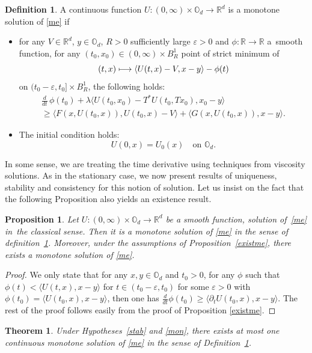 \documentclass[10pt]{amsart}
\newcommand\mto{\mathchoice{\longmapsto}{\mapsto}{\mapsto}{\mapsto}}
\let\epsilon\varepsilon
\newtheorem{Theorem}{Theorem}[section]
\newtheorem{Prop}{Proposition}[section]
\theoremstyle{definition}
\newtheorem{Def}{Definition}[section]
\begin{document}
\begin{Def}\label{defms}
A continuous function $U:(0,\infty)\!\times\!\mathbb{O}_d\!\to\! \mathbb{R}^d$ is a monotone solution of \eqref{me} if
\begin{itemize}
\item for any $V \in \mathbb{R}^d$, $y\!\in\!\mathbb{O}_d$, $R\!>\! 0$ sufficiently large $\epsilon\!>\!0$ and $\phi: \mathbb{R}\!\to\!\mathbb{R}$ a~smooth function, for any $(t_0,x_0)\in (0,\infty) \times B^1_R$ point of strict minimum of
\[
(t,x) \mto \langle U(t,x)-V, x-y\rangle-\phi(t)
\]
on $(t_0-\epsilon, t_0] \times B^1_R$, the following holds:
\begin{multline}\label{testt}
\frac{d}{dt}\, \phi(t_0) + \lambda \langle U(t_0,x_0)-T^*U(t_0,Tx_0),x_0-y \rangle \\
\geq
\langle F(x,U(t_0,x)), U(t_0,x)-V\rangle+\langle G(x,U(t_0,x)), x-y \rangle.
\end{multline}
\item The initial condition holds:
\begin{equation*}
U(0,x) = U_0(x) \quad\text{on } \mathbb{O}_d.
\end{equation*}
\end{itemize}
\end{Def}
In some sense, we are treating the time derivative using techniques from viscosity solutions. As in the stationary case, we now present results of uniqueness, stability and consistency for this notion of solution. Let us insist on the fact that the following Proposition also yields an existence result.
\begin{Prop}
Let $U: (0,\infty)\!\times\!\mathbb{O}_d\!\to\!\mathbb{R}^d$ be a smooth function, solution of~\eqref{me} in~the classical sense. Then it is a monotone solution of \eqref{me} in the sense of definition~\ref{defms}. Moreover, under the assumptions of Proposition~\ref{existme}, there exists a monotone solution of \eqref{me}.
\end{Prop}
\begin{proof}
We only state that for any $x,y \in \mathbb{O}_d$ and $t_0 > 0$, for any $\phi$ such that $\phi(t) < \langle U(t,x), x-y \rangle$ for $t \in (t_0-\epsilon, t_0)$ for some $\epsilon > 0$ with $\phi(t_0) = \langle U(t_0,x), x-y \rangle$, then one has $\frac{d}{dt}\phi(t_0) \geq \langle \partial_t U(t_0,x),x-y\rangle$. The rest of the proof follows easily from the proof of Proposition \ref{existme}.
\end{proof}
\begin{Theorem}\label{uniqt}
Under Hypotheses~\ref{stab} and \ref{mon}, there exists at most one continuous monotone solution of \eqref{me} in the sense of Definition~\ref{defms}.
\end{Theorem}
\end{document}
